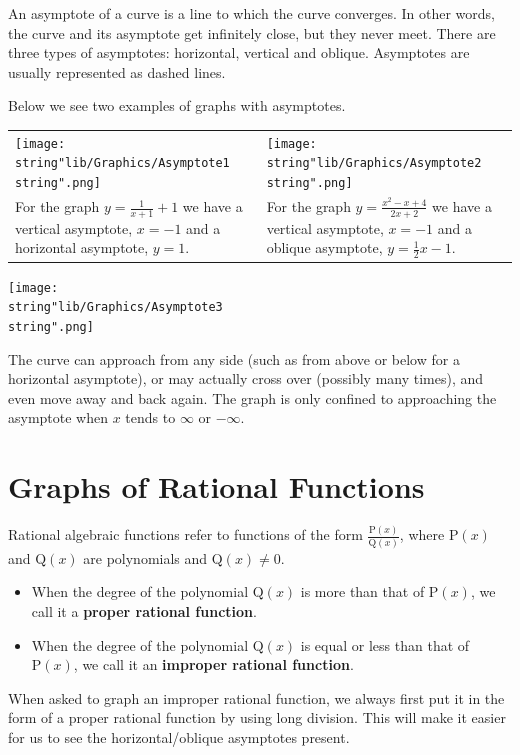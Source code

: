 \documentclass[11pt,a4paper]{book}
\begin{document}
An asymptote of a curve is a line to which the curve converges. In
other words, the curve and its asymptote get infinitely close, but
they never meet. There are three types of asymptotes: horizontal,
vertical and oblique. Asymptotes are usually represented as dashed lines.

\newpage

Below we see two examples of graphs with asymptotes.

\begin{tabular}{>{\centering}p{7.6cm}>{\centering}p{7.6cm}}
\texttt{[image: \\string"lib/Graphics/Asymptote1\\string".png]} & \texttt{[image: \\string"lib/Graphics/Asymptote2\\string".png]}\tabularnewline
For the graph ${\displaystyle y=\frac{1}{x+1}+1}$ we have a vertical
asymptote, $x=-1$ and a horizontal asymptote, $y=1$. & For the graph ${\displaystyle y=\frac{x^{2}-x+4}{2x+2}}$ we have
a vertical asymptote, $x=-1$ and a oblique asymptote, ${\displaystyle y=\frac{1}{2}x-1}$.\tabularnewline
\end{tabular}

\medskip{}

\begin{minipage}{0.5\textwidth}
\texttt{[image: \\string"lib/Graphics/Asymptote3\\string".png]}
\end{minipage}
\begin{minipage}{0.5\textwidth}
The curve can approach from any side (such as from above or below
for a horizontal asymptote), or may actually cross over (possibly
many times), and even move away and back again. The graph is only confined to approaching the asymptote when $x$ tends to $\infty$ or $-\infty$.
\end{minipage}



\section{Graphs of Rational Functions}

Rational algebraic functions refer to functions of the form ${\displaystyle \frac{\text{P}(x)}{\text{Q}(x)}}$,
where $\text{P}(x)$ and $\text{Q}(x)$ are polynomials and $\text{Q}(x)\neq0$.
\begin{itemize}
\item When the degree of the polynomial $\text{Q}\left(x\right)$ is more than that of $\text{P}(x)$, we call it a \textbf{proper rational function}.
\item When the degree of the polynomial $\text{Q}\left(x\right)$ is equal or less than that of $\text{P}(x)$, we call it an \textbf{improper rational function}.
\end{itemize}
When asked to graph an improper rational function, we always first
put it in the form of a proper rational function by using long division. This will make it easier for us to see the horizontal/oblique asymptotes present.
\end{document}
